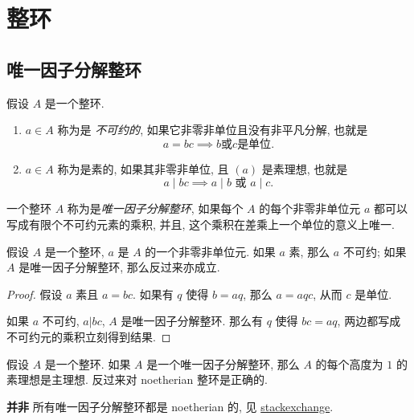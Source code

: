\chapter{整环}

\section{唯一因子分解整环}

假设 \( A \) 是一个整环.

\begin{enumerate}
  \item \( a \in A \) 称为是 \emph{不可约的},
    如果它非零非单位且没有非平凡分解, 也就是
    \[
      a = bc \implies b \text{或} c \text{是单位}.
    \]
  \item \( a \in A \) 称为是素的, 如果其非零非单位, 且 \( (a) \) 是素理想,
    也就是
    \[
      a \mid bc \implies a \mid b \text{ 或 } a \mid c.
    \]
\end{enumerate}
一个整环 \( A \) 称为是\emph{唯一因子分解整环}, 如果每个 \( A \)
的每个非零非单位元 \( a \) 都可以写成有限个不可约元素的乘积, 并且,
这个乘积在差乘上一个单位的意义上唯一.

\begin{proposition}
  \label{proposition-prime-and-irreducible-element}
  假设 \( A \) 是一个整环, \( a \) 是 \( A \) 的一个非零非单位元. 如果 \( a \)
  素, 那么 \( a \) 不可约; 如果 \( A \) 是唯一因子分解整环, 那么反过来亦成立.
\end{proposition}
\begin{proof}
  假设 \( a \) 素且 \( a = bc \). 如果有 \( q \) 使得 \( b = aq \), 那么 \( a =
  aqc \), 从而 \( c \) 是单位.

  如果 \( a \) 不可约, \( a | bc \), \( A \) 是唯一因子分解整环. 那么有 \( q \)
  使得 \( bc = aq \), 两边都写成不可约元的乘积立刻得到结果.
\end{proof}

\begin{corollary}
  假设 \( A \) 是一个整环. 如果 \( A \) 是一个唯一因子分解整环, 那么 \( A \)
  的每个高度为 \( 1 \) 的素理想是主理想.
  反过来对 noetherian 整环是正确的.
\end{corollary}
\begin{remark}
  \textbf{并非} 所有唯一因子分解整环都是 noetherian 的, 见
  \href{https://math.stackexchange.com/questions/254226/does-ufd-imply-noetherian}{stackexchange}.
\end{remark}

